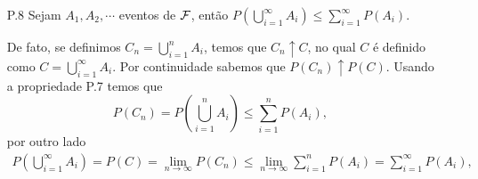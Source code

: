 \begin{frame}
\begin{enumerate}
\item[P.8]  Sejam $ A_1, A_2, \cdots $ eventos de ${\cal F}$, então $ P\left( \bigcup_{i=1}^{\infty}A_i\right)\leq \sum_{i=1}^{\infty} P(A_i).$ 

De fato,  se definimos $ C_n=\displaystyle \bigcup_{i=1}^{n}A_i $, temos que $ C_n\uparrow C $, no qual $C$ é definido como $ C= \bigcup_{i=1}^{\infty}A_i $. Por continuidade sabemos que $ P(C_n)\uparrow P(C) $. Usando a propriedade P.7 temos que $$ P(C_n)= P\left(\displaystyle \bigcup_{i=1}^{n}A_i\right)\leq  \sum_{i=1}^{n} P(A_i),$$ por outro lado 
$$
\begin{aligned}
P\left( \bigcup_{i=1}^{\infty}A_i\right)= P(C)=\lim_{n\rightarrow \infty}P(C_n)  \leq\lim_{n\rightarrow \infty}\sum_{i=1}^{n} P(A_i)= \sum_{i=1}^{\infty} P(A_i),
\end{aligned}$$ 


%
\end{enumerate}
\end{frame}

